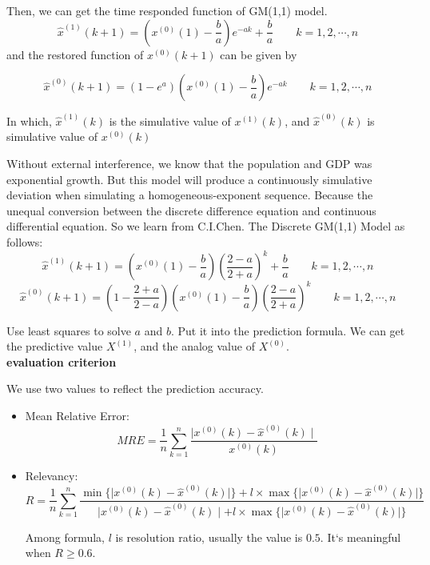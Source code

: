 \documentclass{mcmthesis}
\begin{document}
Then, we can get the time responded function of GM(1,1) model.
\begin{equation}
	\hat{x}^{(1)}(k+1) = (x^{(0)}(1) - \frac{b}{a})e^{-a k} + \frac{b}{a} \qquad k = 1, 2, \cdots, n
\end{equation}
and the restored function of $x^{(0)}(k + 1)$ can be given by

\begin{equation}
	\hat{x}^{(0)}(k+1) = (1 - e^a)(x^{(0)}(1) - \frac{b}{a})e^{-a k} \qquad k = 1, 2, \cdots, n
\end{equation}

\par In which, $\hat{x}^{(1)}(k)$ is the simulative value of  $x^{(1)}(k)$, and  $\hat{x}^{(0)}(k)$ is simulative value of $x^{(0)}(k)$

\par Without external interference, we know that the population and GDP was exponential growth. But this model will produce a continuously simulative deviation when simulating a homogeneous-exponent sequence. Because the unequal conversion between the discrete difference equation and continuous differential equation. So we learn from C.I.Chen\upcite{}. The Discrete GM(1,1) Model as follows:
\begin{equation}
	\hat{x}^{(1)}(k+1) = (x^{(0)}(1) - \frac{b}{a})(\frac{2 - a}{2 + a})^k+ \frac{b}{a} \qquad k = 1, 2, \cdots, n
\end{equation}
\begin{equation}
	\hat{x}^{(0)}(k+1) = (1 - \frac{2 + a}{2 - a})(x^{(0)}(1) - \frac{b}{a})(\frac{2 - a}{2 + a})^k \qquad k = 1, 2, \cdots, n
\end{equation}
\par Use least squares to solve $a$ and $b$. Put it into the prediction formula. We can get the predictive value $X^{(1)}$, and the analog value of $X^{(0)}$.\\

\textbf{evaluation criterion}
\par We use two values to reflect the prediction accuracy.

\begin{itemize}
	\item Mean Relative Error:
	\begin{equation}
		MRE = \frac{1}{n} \sum \limits_{k = 1}^n \frac{\mid x^{(0)}(k) - \hat{x}^{(0)}(k) \mid}{x^{(0)}(k)}
	\end{equation}
	\item Relevancy:
	\begin{equation}
		R = \frac{1}{n} \sum \limits_{k = 1}^n \frac{\min \{\mid x^{(0)}(k) - \hat{x}^{(0)}(k) \mid\} + l \times \max\{\mid x^{(0)}(k) - \hat{x}^{(0)}(k) \mid\}}{\mid x^{(0)}(k) - \hat{x}^{(0)}(k) \mid + l \times \max\{\mid x^{(0)}(k) - \hat{x}^{(0)}(k) \mid\}}
	\end{equation}
	\par Among formula, $l$ is resolution ratio, usually the value is $0.5$. It`s meaningful when $R \geq 0.6$.
\end{itemize}
\end{document}
